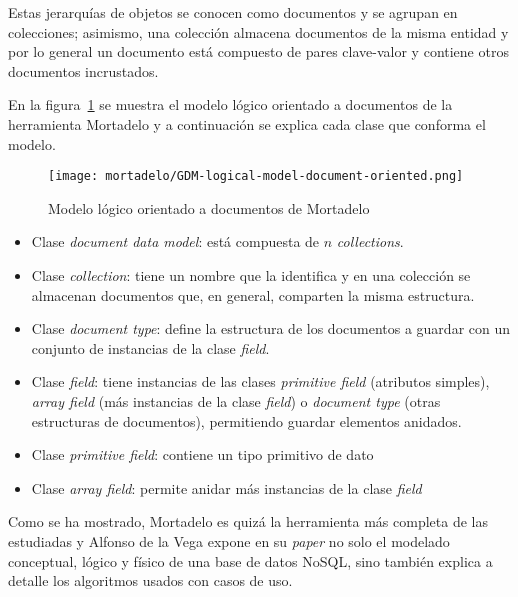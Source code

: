 Estas jerarquías de objetos se conocen como documentos y se agrupan en colecciones; asimismo, una colección almacena documentos de la misma entidad y por lo general un documento está compuesto de pares clave-valor y contiene otros documentos incrustados.


En la figura~\ref{img:mortadelo-gdm-logical-model-document-oriented} se muestra el modelo lógico orientado a documentos de la herramienta Mortadelo y a continuación se explica cada clase que conforma el modelo.


\begin{figure}[H] 
    \centering
    \texttt{[image: mortadelo/GDM-logical-model-document-oriented.png]}
    \caption{Modelo lógico orientado a documentos de Mortadelo}
    \label{img:mortadelo-gdm-logical-model-document-oriented}
\end{figure}


\begin{itemize}
    \item Clase \textit{document data model}: está compuesta de $n$ \textit{collections}.
    \item Clase \textit{collection}: tiene un nombre que la identifica y en una colección se almacenan documentos que, en general, comparten la misma estructura.
    \item Clase \textit{document type}: define la estructura de los documentos a guardar con un conjunto de instancias de la clase \textit{field}.
    \item Clase \textit{field}: tiene instancias de las clases \textit{primitive field} (atributos simples), \textit{array field} (más instancias de la clase \textit{field}) o \textit{document type} (otras estructuras de documentos), permitiendo guardar elementos anidados.
    \item Clase \textit{primitive field}: contiene un tipo primitivo de dato
    \item Clase \textit{array field}: permite anidar más instancias de la clase \textit{field}
\end{itemize}


Como se ha mostrado, Mortadelo es quizá la herramienta más completa de las estudiadas y Alfonso de la Vega expone en su \textit{paper} no solo el modelado conceptual, lógico y físico de una base de datos NoSQL, sino también explica a detalle los algoritmos usados con casos de uso.